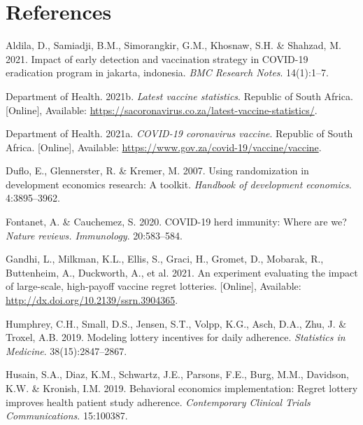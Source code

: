 \documentclass[11pt,preprint, authoryear]{elsarticle}
\numberwithin{equation}{section}
\numberwithin{figure}{section}
\numberwithin{table}{section}
\newlength{\cslhangindent}
\newenvironment{CSLReferences}%
  {\setlength{\parindent}{0pt}%
  \everypar{\setlength{\hangindent}{\cslhangindent}}\ignorespaces}%
  {\par}
\begin{document}
\newpage

\hypertarget{references}{%
\section*{References}\label{references}}

\hypertarget{refs}{}
\begin{CSLReferences}{1}{0}
\leavevmode\hypertarget{ref-erad}{}%
Aldila, D., Samiadji, B.M., Simorangkir, G.M., Khosnaw, S.H. \& Shahzad,
M. 2021. Impact of early detection and vaccination strategy in COVID-19
eradication program in jakarta, indonesia. \emph{BMC Research Notes}.
14(1):1--7.

\leavevmode\hypertarget{ref-stat}{}%
Department of Health. 2021b. \emph{Latest vaccine statistics}. Republic
of South Africa. {[}Online{]}, Available:
\url{https://sacoronavirus.co.za/latest-vaccine-statistics/}.

\leavevmode\hypertarget{ref-herd}{}%
Department of Health. 2021a. \emph{COVID-19 coronavirus vaccine}.
Republic of South Africa. {[}Online{]}, Available:
\url{https://www.gov.za/covid-19/vaccine/vaccine}.

\leavevmode\hypertarget{ref-random}{}%
Duflo, E., Glennerster, R. \& Kremer, M. 2007. Using randomization in
development economics research: A toolkit. \emph{Handbook of development
economics}. 4:3895--3962.

\leavevmode\hypertarget{ref-immun}{}%
Fontanet, A. \& Cauchemez, S. 2020. COVID-19 herd immunity: Where are
we? \emph{Nature reviews. Immunology}. 20:583--584.

\leavevmode\hypertarget{ref-regret}{}%
Gandhi, L., Milkman, K.L., Ellis, S., Graci, H., Gromet, D., Mobarak,
R., Buttenheim, A., Duckworth, A., et al. 2021. An experiment evaluating
the impact of large-scale, high-payoff vaccine regret lotteries.
{[}Online{]}, Available: \url{http://dx.doi.org/10.2139/ssrn.3904365}.

\leavevmode\hypertarget{ref-adhere}{}%
Humphrey, C.H., Small, D.S., Jensen, S.T., Volpp, K.G., Asch, D.A., Zhu,
J. \& Troxel, A.B. 2019. Modeling lottery incentives for daily
adherence. \emph{Statistics in Medicine}. 38(15):2847--2867.

\leavevmode\hypertarget{ref-regr}{}%
Husain, S.A., Diaz, K.M., Schwartz, J.E., Parsons, F.E., Burg, M.M.,
Davidson, K.W. \& Kronish, I.M. 2019. Behavioral economics
implementation: Regret lottery improves health patient study adherence.
\emph{Contemporary Clinical Trials Communications}. 15:100387.


\end{CSLReferences}
\end{document}
